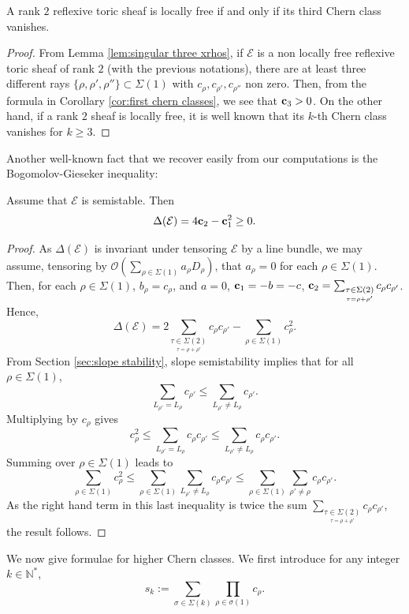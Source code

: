 \documentclass[a4paper,10pt]{amsart}
\theoremstyle{plain}{
    \newtheorem{theorem}{Theorem}[section]
    \newtheorem{lemma}[theorem]{Lemma}
    \newtheorem{corollary}[theorem]{Corollary}
    \newtheorem{proposition}[theorem]{Proposition}
    \newtheorem{conjecture}[theorem]{Conjecture}
}
\theoremstyle{definition}{
    \newtheorem{definition}[theorem]{Definition}
    \newtheorem{defn-thm}[theorem]{Definition-Theorem}
    \newtheorem{example}[theorem]{Example}
    \newtheorem{notation}[theorem]{Notation}
}
\theoremstyle{remark}{
    \newtheorem{remark}[theorem]{Remark}
    \newtheorem{problem}[theorem]{Problem}
    \newtheorem{question}[theorem]{Question}
}
\def\uc{{\bf c}}
\def\cE{\mathcal{E}}
\def\cO{\mathcal{O}}
\def\N{\mathbb{N}}
\begin{document}
\begin{corollary}
 \label{cor:loc free iff c3 vanishes}
 A rank $2$ reflexive toric sheaf is locally free if and only if its third Chern class vanishes.
\end{corollary}
\begin{proof}
 From Lemma \ref{lem:singular three xrhos}, if $\cE$ is a non locally free reflexive toric sheaf of rank $2$ (with the previous notations), there are at least three different rays $\lbrace \rho,\rho',\rho''\rbrace\subset\Sigma(1)$ with $c_\rho, c_{\rho'}, c_{\rho''}$ non zero. Then, from the formula in Corollary \ref{cor:first chern classes}, we see that $\uc_3 >0$. On the other hand, if a rank $2$ sheaf is locally free, it is well known that its $k$-th Chern class vanishes for $k\geq 3$.
\end{proof}
Another well-known fact that we recover easily from our computations is the Bogomolov-Gieseker inequality:
\begin{corollary}
\label{cor:BogGies}
Assume that $\cE$ is semistable. Then
$$
\Delta(\cE)=4\uc_2-\uc_1^2\geq 0.
$$
\end{corollary}
\begin{proof}
 As $\Delta(\cE)$ is invariant under tensoring $\cE$ by a line bundle, we may assume, tensoring by $\cO(\sum_{\rho\in\Sigma(1)} a_\rho D_\rho )$, that $a_\rho=0$ for each $\rho\in\Sigma(1)$. Then, for each $\rho\in\Sigma(1)$, $b_\rho=c_\rho$, and $a=0$, $\uc_1=- b=-c$, $\uc_2=\sum_{\underset{\tau=\rho+\rho'}{\tau\in\Sigma(2)}}c_{\rho}c_{\rho'}$.
 Hence,
 $$
 \Delta(\cE)=2\sum_{\underset{\tau=\rho+\rho'}{\tau\in\Sigma(2)}}c_{\rho}c_{\rho'}-\sum_{\rho\in\Sigma(1)} c_\rho^2.
 $$
 From Section \ref{sec:slope stability}, slope semistability implies that for all $\rho\in\Sigma(1)$,
 $$
 \sum_{L_{\rho'}=L_\rho} c_{\rho'}\leq \sum_{L_{\rho'}\neq L_\rho} c_{\rho'}.
 $$
 Multiplying by $c_\rho$ gives
 $$
 c_\rho^2\leq \sum_{L_{\rho'}=L_\rho} c_\rho c_{\rho'}\leq \sum_{L_{\rho'}\neq L_\rho} c_\rho c_{\rho'}.
 $$
 Summing over $\rho\in\Sigma(1)$ leads to 
 $$
 \sum_{\rho\in\Sigma(1)}  c_{\rho}^2\leq \sum_{\rho\in\Sigma(1)} \sum_{L_{\rho'}\neq L_\rho} c_\rho c_{\rho'}\leq \sum_{\rho\in\Sigma(1)} \sum_{\rho'\neq \rho} c_\rho c_{\rho'}.
$$
 As the right hand term in this last inequality is twice the sum $\sum_{\underset{\tau=\rho+\rho'}{\tau\in\Sigma(2)}}c_{\rho}c_{\rho'}$, the result follows.
\end{proof}
We now give formulae for higher Chern classes. We first introduce for any integer $k\in \N^*$,
$$
s_k:=\sum_{\sigma\in\Sigma(k)} \prod_{\rho\in\sigma(1)}c_\rho.
$$
\end{document}

